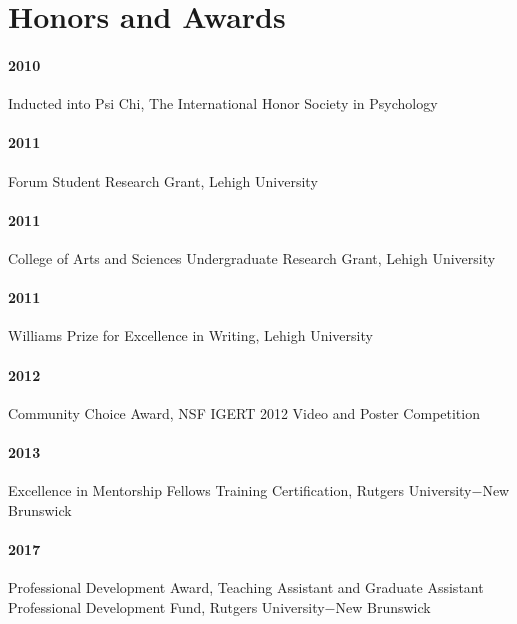 \section*{Honors and Awards}
\label{sec:honorsawards}

\paragraph{2010} Inducted into Psi Chi, The International Honor Society in Psychology

\paragraph{2011} Forum Student Research Grant, Lehigh University

\paragraph{2011} College of Arts and Sciences Undergraduate Research Grant, Lehigh University

\paragraph{2011} Williams Prize for Excellence in Writing, Lehigh University

\paragraph{2012} Community Choice Award, NSF IGERT 2012 Video and Poster Competition

\paragraph{2013} Excellence in Mentorship Fellows Training Certification, Rutgers University$-$New Brunswick

\paragraph{2017} Professional Development Award, Teaching Assistant and Graduate Assistant Professional Development Fund, Rutgers University$-$New Brunswick

